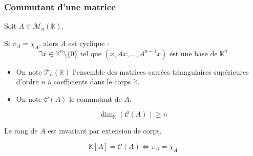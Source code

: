   \subsubsection{Commutant d'une matrice}

  Soit $A \in \mathcal{M}_n(\mathbb{K})$.


  \begin{lemma}
    Si $\pi_A = \chi_A$, alors $A$ est cyclique :
    \[ \exists x \in \mathbb{K}^n \setminus \{ 0 \} \text{ tel que } (x, Ax, \dots, A^{n-1}x) \text{ est une base de } \mathbb{K}^n \]
  \end{lemma}


  \begin{notation}
    \begin{itemize}
      \item On note $\mathcal{T}_n(\mathbb{K})$ l'ensemble des matrices carrées triangulaires supérieures d'ordre $n$ à coefficients dans le corps $\mathbb{K}$.
      \item On note $\mathcal{C}(A)$ le commutant de $A$.
    \end{itemize}
  \end{notation}

  \begin{lemma}
    \[ \dim_{\mathbb{K}}(\mathcal{C}(A)) \geq n \]
  \end{lemma}

  \begin{lemma}
    Le rang de $A$ est invariant par extension de corps.
  \end{lemma}

  \begin{theorem}
    \[ \mathbb{K}[A] = \mathcal{C}(A) \iff \pi_A = \chi_A \]
  \end{theorem}

